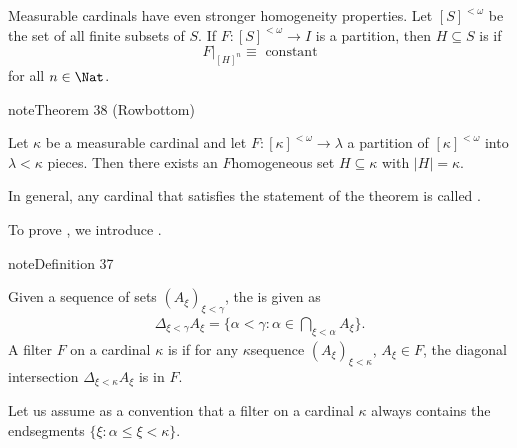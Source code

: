 \documentclass[letterpaper,10pt,english]{jupyterBook}
\begin{document}
\sphinxAtStartPar
Measurable cardinals have even stronger homogeneity properties. Let \([S]^{<\omega}\) be the set of all finite subsets of \(S\). If \(F: [S]^{<\omega} \to I\) is a partition, then \(H \subseteq S\) is  if
\begin{equation*}
	F|_{[H]^n} \equiv \text{ constant} 
\end{equation*}
\sphinxAtStartPar
for all \(n \in \Nat\).
\label{large_cardinals:thm-measurable-Ramsey}
\begin{sphinxadmonition}{note}{Theorem 38 (Rowbottom)}



\sphinxAtStartPar
Let \(\kappa\) be a measurable cardinal and let \(F: [\kappa]^{<\omega} \to \lambda\) a partition of \([\kappa]^{<\omega}\) into \(\lambda < \kappa\) pieces. Then there exists an \(F\)\sphinxhyphen{}homogeneous set \(H \subseteq \kappa\) with \(|H| = \kappa\).
\end{sphinxadmonition}

\sphinxAtStartPar
In general, any cardinal that satisfies the statement of the theorem is called .

\sphinxAtStartPar
To prove {\hyperref[\detokenize{large_cardinals:thm-measurable-Ramsey}]{}}, we introduce .
\label{large_cardinals:def-normal-filter}
\begin{sphinxadmonition}{note}{Definition 37}



\sphinxAtStartPar
Given a sequence of sets \((A_\xi)_{\xi < \gamma}\), the  is given as
\begin{equation*}
\begin{split}
    \Delta_{\xi < \gamma} A_\xi = \{ \alpha < \gamma \colon  \alpha \in \bigcap_{\xi < \alpha} A_\xi \}.
\end{split}
\end{equation*}
\sphinxAtStartPar
A filter \(F\) on a cardinal \(\kappa\) is  if for any \(\kappa\)\sphinxhyphen{}sequence \((A_\xi)_{\xi < \kappa}\), \(A_\xi \in F\), the diagonal intersection \(\Delta_{\xi < \kappa} A_\xi\) is in \(F\).
\end{sphinxadmonition}

\sphinxAtStartPar
Let us assume as a convention that a filter on a cardinal \(\kappa\) always contains the end\sphinxhyphen{}segments \(\{\xi \colon \alpha \leq \xi < \kappa\}\).
\end{document}
